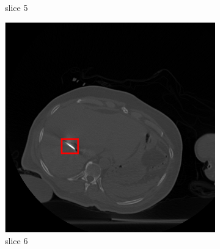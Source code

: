 \documentclass[journal]{IEEEtran}
\begin{document}
\begin{figure}[h!]
\begin{subfigure}[b]{0.24\linewidth}
 \caption{slice 5}
    \end{subfigure}
              \begin{subfigure}[b]{0.24\linewidth}
        \includegraphics[width=\textwidth]{../images/tmh/RFA2/template6_color.png}
 \caption{slice 6}
    \end{subfigure}
       \begin{subfigure}[b]{0.23\linewidth}

\end{subfigure}
\end{figure}
\end{document}
